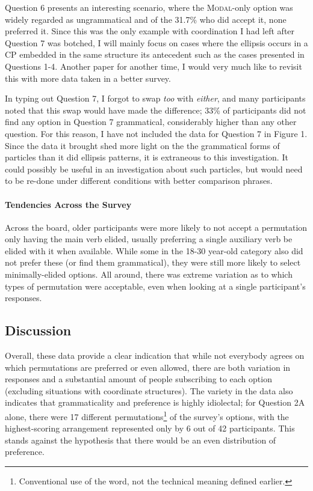 \documentclass[11pt, oneside]{article}
\begin{document}
Question 6 presents an interesting scenario, where the \textsc{Modal}-only option was widely regarded as ungrammatical and of the 31.7\% who did accept it, none preferred it. Since this was the only example with coordination I had left after Question 7 was botched, I will mainly focus on cases where the ellipsis occurs in a CP embedded in the same structure its antecedent  such as the cases presented in Questions 1-4. Another paper for another time, I would very much like to revisit this with more data taken in a better survey.

In typing out Question 7, I forgot to swap \textit{too} with \textit{either}, and many participants noted that this swap would have made the difference; 33\% of participants did not find any option in Question 7 grammatical, considerably higher than any other question. For this reason, I have not included the data for Question 7 in Figure 1. Since the data it brought shed more light on the the grammatical forms of particles than it did ellipsis patterns, it is extraneous to this investigation. It could possibly be useful in an investigation about such particles, but would need to be re-done under different conditions with better comparison phrases.

\paragraph{Tendencies Across the Survey}
Across the board, older participants were more likely to not accept a permutation only having the main verb elided, usually preferring a single auxiliary verb be elided with it when available. While some in the 18-30 year-old category also did not prefer these (or find them grammatical), they were still more likely to select minimally-elided options. All around, there was extreme variation as to which types of permutation were acceptable, even when looking at a single participant's responses.

\subsection{Discussion}

Overall, these data provide a clear indication that while not everybody agrees on which permutations are preferred or even allowed, there are both variation in responses and a substantial amount of people subscribing to each option (excluding situations with coordinate structures). The variety in the data also indicates that grammaticality and preference is highly idiolectal; for Question 2A alone, there were 17 different permutations\footnote{Conventional use of the word, not the technical meaning defined earlier.} of the survey's options, with the highest-scoring arrangement represented only by 6 out of 42 participants. This stands against the hypothesis that there would be an even distribution of preference.
\end{document}
